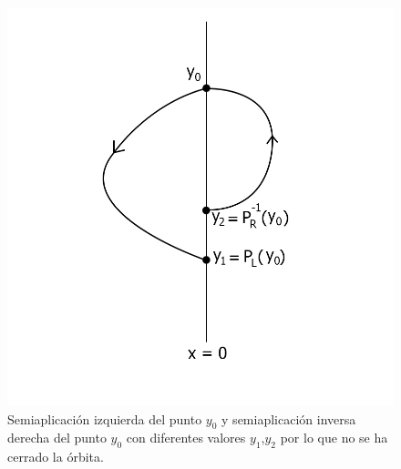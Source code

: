 \documentclass[12pt,a4paper]{report} %
\begin{document}
	\begin{figure}[h]
		\centering
		\includegraphics[width=1\textwidth]{aplipoincareL-R.jpg}
		\caption{Semiaplicación izquierda del punto $y_0$ y semiaplicación inversa derecha del punto $y_0$ con diferentes valores $y_1$,$y_2$ por lo que no se ha cerrado la órbita.}
		\label{fig:aplipoincareL-R}
	\end{figure}\smallskip
	
	\newpage
	
\end{document}
